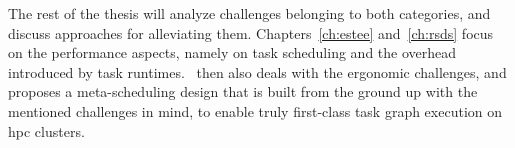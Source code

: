 The rest of the thesis will analyze challenges belonging to both categories, and discuss approaches
for alleviating them. Chapters~\ref{ch:estee} and~\ref{ch:rsds} focus on the
performance aspects, namely on task scheduling and the overhead introduced by task
runtimes.~ then also deals with the ergonomic challenges, and proposes a
meta-scheduling design that is built from the ground up with the mentioned challenges in mind, to
enable truly first-class task graph execution on \gls{hpc} clusters.
